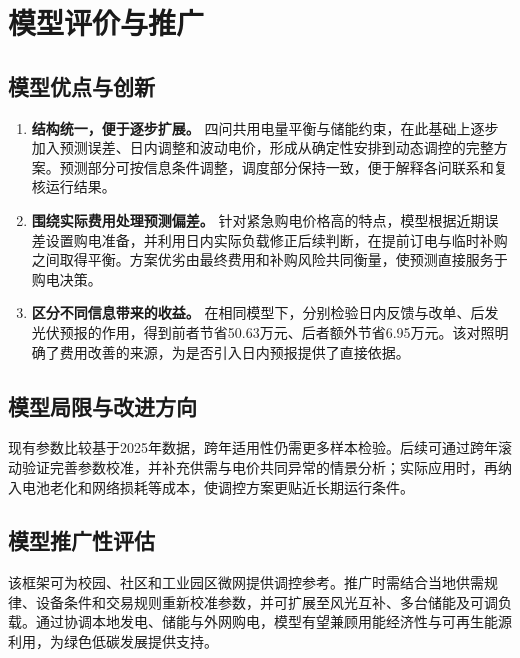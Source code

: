 \section{模型评价与推广}

\subsection{模型优点与创新}

\begin{enumerate}
    \item \textbf{结构统一，便于逐步扩展。}
    四问共用电量平衡与储能约束，在此基础上逐步加入预测误差、日内调整和波动电价，形成从确定性安排到动态调控的完整方案。预测部分可按信息条件调整，调度部分保持一致，便于解释各问联系和复核运行结果。

    \item \textbf{围绕实际费用处理预测偏差。}
    针对紧急购电价格高的特点，模型根据近期误差设置购电准备，并利用日内实际负载修正后续判断，在提前订电与临时补购之间取得平衡。方案优劣由最终费用和补购风险共同衡量，使预测直接服务于购电决策。

    \item \textbf{区分不同信息带来的收益。}
    在相同模型下，分别检验日内反馈与改单、后发光伏预报的作用，得到前者节省50.63万元、后者额外节省6.95万元。该对照明确了费用改善的来源，为是否引入日内预报提供了直接依据。
\end{enumerate}

\subsection{模型局限与改进方向}

现有参数比较基于2025年数据，跨年适用性仍需更多样本检验。后续可通过跨年滚动验证完善参数校准，并补充供需与电价共同异常的情景分析；实际应用时，再纳入电池老化和网络损耗等成本，使调控方案更贴近长期运行条件。

\subsection{模型推广性评估}

该框架可为校园、社区和工业园区微网提供调控参考。推广时需结合当地供需规律、设备条件和交易规则重新校准参数，并可扩展至风光互补、多台储能及可调负载。通过协调本地发电、储能与外网购电，模型有望兼顾用能经济性与可再生能源利用，为绿色低碳发展提供支持。
